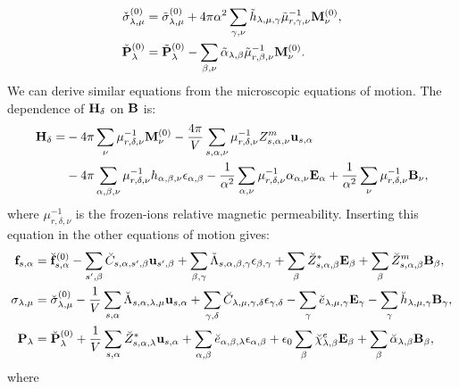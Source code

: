 \documentclass[12pt,a4paper,twoside]{report}
\begin{document}
{\begin{align}
\check \sigma^{(0)}_{\lambda,\mu} &= \tilde \sigma^{(0)}_{\lambda,\mu}
+ 4 \pi \alpha^2 \sum_{\gamma,\nu} \tilde h_{\lambda,\mu,\gamma} 
\tilde \mu^{-1}_{r,\gamma,\nu} {\bf M}^{(0)}_\nu,  \\
\check {\bf P}^{(0)}_{\lambda} &= \tilde {\bf P}^{(0)}_{\lambda}
- \sum_{\beta,\nu} \tilde \alpha_{\lambda,\beta} 
\tilde \mu^{-1}_{r,\beta,\nu} {\bf M}^{(0)}_\nu. 
\end{align}
We can derive similar equations from the microscopic equations of motion.
The dependence of ${\bf H}_\delta$ on ${\bf B}$ is:
\begin{align}
{\bf H}_\delta = 
&- 4 \pi \sum_\nu \mu^{-1}_{r,\delta,\nu} {\bf M}^{(0)}_\nu 
-{4 \pi \over V} \sum_{s,\alpha,\nu} \mu^{-1}_{r,\delta,\nu} Z^m_{s,\alpha,\nu}
{\bf u}_{s,\alpha} \nonumber\\
&- 4 \pi \sum_{\alpha,\beta,\nu} \mu^{-1}_{r,\delta,\nu} h_{\alpha,\beta,\nu}
\epsilon_{\alpha,\beta} - {1\over \alpha^2} \sum_{\alpha,\nu}
\mu^{-1}_{r,\delta,\nu} \alpha_{\alpha,\nu} {\bf E}_\alpha
+ {1\over \alpha^2} \sum_\nu \mu^{-1}_{r,\delta,\nu} {\bf B}_\nu, 
\end{align}
where $\mu^{-1}_{r,\delta,\nu}$ is the frozen-ions relative magnetic
permeability.
Inserting this equation in the other equations of motion gives:
\begin{align}
{\bf f}_{s,\alpha}&= \breve{\bf f}^{(0)}_{s,\alpha}
-\sum_{s',\beta} \breve C_{s,\alpha,s',\beta} {\bf u}_{s',\beta}
+\sum_{\beta,\gamma}
\breve \Lambda_{s,\alpha,\beta,\gamma} 
\epsilon_{\beta,\gamma} +
\sum_{\beta} \breve Z^*_{s,\alpha,\beta} {\bf E}_{\beta}
+\sum_{\beta} 
\breve Z^m_{s,\alpha,\beta} {\bf B}_{\beta}, \\
\sigma_{\lambda,\mu}&= \breve  \sigma_{\lambda,\mu}^{(0)}
-{1\over V} \sum_{s,\alpha}
\breve \Lambda_{s,\alpha,\lambda,\mu} {\bf u}_{s,\alpha}
+\sum_{\gamma,\delta} \breve C_{\lambda,\mu,\gamma,\delta}  
\epsilon_{\gamma,\delta} -
\sum_{\gamma} \breve e_{\lambda,\mu,\gamma} 
 {\bf E}_{\gamma}
-\sum_{\gamma}  \breve h_{\lambda,\mu,\gamma} 
{\bf B}_{\gamma}, \\
{\bf P}_{\lambda}&= \breve {\bf P}^{(0)}_{\lambda}
+{1\over V} \sum_{s,\alpha} \breve Z^*_{s,\alpha,\lambda} 
{\bf u}_{s,\alpha} +
\sum_{\alpha,\beta} \breve e_{\alpha,\beta,\lambda} 
\epsilon_{\alpha,\beta} +
\epsilon_0 \sum_{\beta} 
\breve \chi^e_{\lambda,\beta}
{\bf E}_{\beta} +
\sum_{\beta} \breve \alpha_{\lambda,\beta} 
{\bf B}_{\beta}, 
\end{align}
where
}
\end{document}
